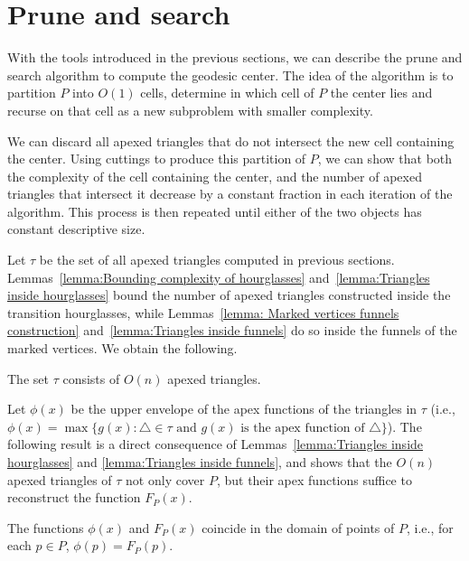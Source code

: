 \documentclass[a4paper,UKenglish]{lipics}
\newcommand{\F}[2]{\ensuremath{F_{\scriptscriptstyle #1}(#2)}}
\newcommand{\fn}[2]{\ensuremath{S_{\scriptscriptstyle #1}(#2)}}
\newcommand{\ff}[1]{\ensuremath{f(#1)}}
\newcommand{\g}[2]{\ensuremath{|\pi(#1, #2)|}}
\begin{document}
\section{Prune and search}\label{section:Prune and search}
With the tools introduced in the previous sections, we can describe the prune and search algorithm to compute the geodesic center. 
The idea of the algorithm is to partition $P$ into $O(1)$ cells, determine in which cell of $P$ the center lies and recurse on that cell as a new subproblem with smaller complexity.

We can discard all apexed triangles that do not intersect the new cell containing the center. Using cuttings to produce this partition of $P$, we can show that both the complexity of the cell containing the center, and the number of apexed triangles that intersect it decrease by a constant fraction in each iteration of the algorithm. This process is then repeated until either of the two objects has constant descriptive size. 

Let $\tau$ be the set of all apexed triangles computed in previous sections. 
Lemmas~\ref{lemma:Bounding complexity of hourglasses} and~\ref{lemma:Triangles inside hourglasses} bound the number of apexed triangles constructed inside the transition hourglasses, while Lemmas~\ref{lemma: Marked vertices funnels construction} and~\ref{lemma:Triangles inside funnels} do so inside the funnels of the marked vertices. We obtain the following.

\begin{corollary}\label{lemma:Size of tau}
The set $\tau$ consists of $O(n)$ apexed triangles.
\end{corollary}

Let $\phi(x)$ be the upper envelope of the apex functions of the triangles in $\tau$ (i.e., $\phi(x) = \max\{g(x) : \triangle \in \tau\text{ and $g(x)$ is the apex function of $\triangle$} \}$). The following result is a direct consequence of Lemmas~\ref{lemma:Triangles inside hourglasses} and \ref{lemma:Triangles inside funnels}, and shows that the $O(n)$ apexed triangles of $\tau$ not only cover $P$, but their apex functions suffice to reconstruct the function $\F{P}{x}$.

\begin{lemma}\label{lemma:Optimization problem same as geodesic center}
The functions $\phi(x)$ and $\F{P}{x}$ coincide in the domain of points of $P$, i.e., for each $p\in P$, $\phi(p) = \F{P}{p}$.
\end{lemma}
\end{document}
